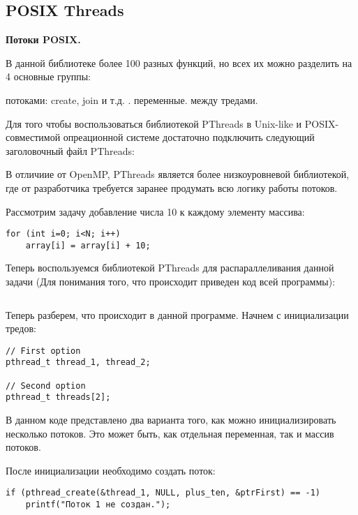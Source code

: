 \subsection{POSIX Threads}
\label{PThreads:section}

\textbf{Потоки POSIX.} 

В данной библиотеке более 100 разных функций, но всех их можно разделить на 4 основные группы:

\begin{itemize}
     потоками: create, join и т.д.
    .
     переменные.
     между тредами.
\end{itemize}

Для того чтобы воспользоваться библиотекой PThreads в Unix-like и POSIX-совместимой опреационной системе достаточно подключить следующий заголовочный файл PThreads: 

В отличиие от OpenMP, PThreads является более низкоуровневой библиотекой, где от разработчика требуется заранее продумать всю логику работы потоков.

Рассмотрим задачу добавление числа 10 к каждому элементу массива:

\begin{verbatim}
for (int i=0; i<N; i++)
    array[i] = array[i] + 10;
\end{verbatim}

Теперь воспользуемся библиотекой PThreads для распараллеливания данной задачи (Для понимания того, что происходит приведен код всей программы):

\inputminted{c++}{listings/WithPosix.c}

Теперь разберем, что происходит в данной программе. Начнем с инициализации тредов:

\begin{verbatim}
// First option
pthread_t thread_1, thread_2;

// Second option
pthread_t threads[2];
\end{verbatim}

В данном коде представлено два варианта того, как можно инициализировать несколько потоков. Это может быть, как отдельная переменная, так и массив потоков.

После инициализации необходимо создать поток:

\begin{verbatim}
if (pthread_create(&thread_1, NULL, plus_ten, &ptrFirst) == -1)
    printf("Поток 1 не создан.");
\end{verbatim}

